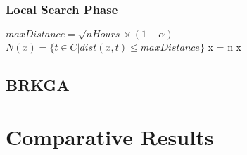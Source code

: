 \documentclass{article}
\begin{document}
	\subsubsection{Local Search Phase}
	\begin{algorithmic}
		\State $maxDistance = \sqrt{nHours} \times (1-\alpha)$
		\State $N(x) = \{t \in C | dist(x,t) \leq maxDistance \}$
				\State x = n
			\EndIf
		\EndFor
		\State \Return x
	\EndFunction
	\end{algorithmic}
	\subsection{BRKGA}
	\section{Comparative Results}
\end{document}
